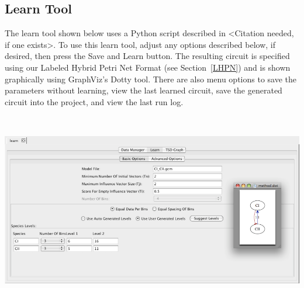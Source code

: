 \documentclass[titlepage,11pt]{article}
\begin{document}
\clearpage

\subsection{\label{learnTool}Learn Tool}

\noindent
The learn tool shown below uses a Python script described in <Citation needed,
if one exists>. To use this learn tool, adjust
any options described below, if desired, then press the Save and
Learn button. The resulting circuit is specified using
our Labeled Hybrid Petri Net Format (see Section~\ref{LHPN}) and is shown
graphically using GraphViz's Dotty tool.  There are also 
menu options to save the parameters without learning, view the last learned 
circuit, save the generated circuit into the project, and view the last run
log. 
\begin{center}
\includegraphics[height=85mm]{screenshots/learn}
\end{center}
\end{document}
